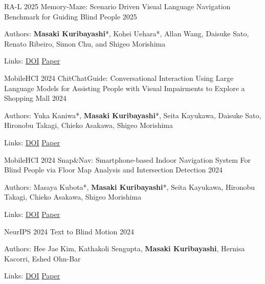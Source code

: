 \begin{cventries}
  \cventry
    {RA-L 2025}
    {Memory-Maze: Scenario Driven Visual Language Navigation Benchmark for Guiding Blind People}
    {}
    {2025}
    {
      \begin{cvitems}
        \item {Authors: \textbf{Masaki Kuribayashi}*, Kohei Uehara*, Allan Wang, Daisuke Sato, Renato Ribeiro, Simon Chu, and Shigeo Morishima}
        \item {Links: \href{https://doi.org/10.1109/LRA.2025.3615028}{DOI} \enskip\textbar\enskip \href{https://chestnutforestlabo.github.io/website/data/project/masaki_kuribayashi_ra_l_2025/paper.pdf}{Paper}}
      \end{cvitems}
    }

  \cventry
    {MobileHCI 2024}
    {ChitChatGuide: Conversational Interaction Using Large Language Models for Assisting People with Visual Impairments to Explore a Shopping Mall}
    {}
    {2024}
    {
      \begin{cvitems}
        \item {Authors: Yuka Kaniwa*, \textbf{Masaki Kuribayashi}*, Seita Kayukawa, Daisuke Sato, Hironobu Takagi, Chieko Asakawa, Shigeo Morishima}
        \item {Links: \href{https://doi.org/10.1145/3676492}{DOI} \enskip\textbar\enskip \href{https://chestnutforestlabo.github.io/website/data/project/yuka_kaniwa_mobilehci_2024/paper.pdf}{Paper}}
      \end{cvitems}
    }

  \cventry
    {MobileHCI 2024}
    {Snap\&Nav: Smartphone-based Indoor Navigation System For Blind People via Floor Map Analysis and Intersection Detection}
    {}
    {2024}
    {
      \begin{cvitems}
        \item {Authors: Masaya Kubota*, \textbf{Masaki Kuribayashi}*, Seita Kayukawa, Hironobu Takagi, Chieko Asakawa, Shigeo Morishima}
        \item {Links: \href{https://doi.org/10.1145/3676522}{DOI} \enskip\textbar\enskip \href{https://chestnutforestlabo.github.io/website/data/project/masaya_kubota_mobilehci_2024/paper.pdf}{Paper}}
      \end{cvitems}
    }

  \cventry
    {NeurIPS 2024}
    {Text to Blind Motion}
    {}
    {2024}
    {
      \begin{cvitems}
        \item {Authors: Hee Jae Kim, Kathakoli Sengupta, \textbf{Masaki Kuribayashi}, Hernisa Kacorri, Eshed Ohn-Bar}
        \item {Links: \href{https://doi.org/10.52202/079017-0519}{DOI} \enskip\textbar\enskip \href{https://chestnutforestlabo.github.io/website/data/project/hee_jae_kim_neurips_2024/paper.pdf}{Paper}}
      \end{cvitems}
    }


\end{cventries}
